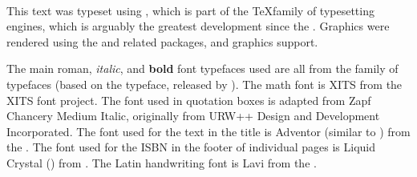 \vfill\mbox{}
%
\newpage
\renewcommand{\headrulewidth}{1pt}
\thispagestyle{empty}%
\mbox{}\\\vfill
{}
{\sffamily
This text was typeset using \hi{\XeLaTeX},
which is part of the \TeX family of typesetting engines, 
which is arguably the greatest development since the .
Graphics were rendered using the  and related packages, and \hi{\LaTeX} graphics support.

The main {\rmfamily roman}, {\itshape italic}, and {\bfseries bold} font typefaces used 
are all from the  family of typefaces
(based on the  typeface, released by ).
The math font is {{\fntXits XITS}} from the {{\fntXits XITS font project}}.
The font used in quotation boxes is adapted from {\fntZapf Zapf Chancery Medium Italic},
originally from URW++ Design and Development Incorporated.
The font used for the text in the title is {\fntAdventor Adventor} (similar to ) from the .
The font used for the ISBN in the footer of individual pages is 
\mbox{\fntDigital\footnotesize Liquid} \mbox{\fntDigital\footnotesize Crystal} 
() from .
The Latin handwriting font is {\fntLavi Lavi} from the .

}
